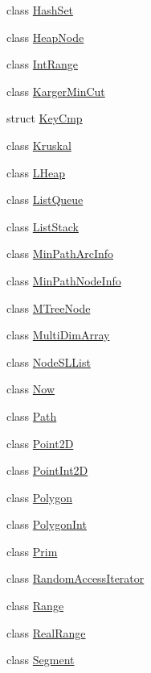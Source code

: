 \begin{DoxyCompactItemize}
class \hyperlink{class_designar_1_1_hash_set}{Hash\+Set}
\item 
class \hyperlink{class_designar_1_1_heap_node}{Heap\+Node}
\item 
class \hyperlink{class_designar_1_1_int_range}{Int\+Range}
\item 
class \hyperlink{class_designar_1_1_karger_min_cut}{Karger\+Min\+Cut}
\item 
struct \hyperlink{struct_designar_1_1_key_cmp}{Key\+Cmp}
\item 
class \hyperlink{class_designar_1_1_kruskal}{Kruskal}
\item 
class \hyperlink{class_designar_1_1_l_heap}{L\+Heap}
\item 
class \hyperlink{class_designar_1_1_list_queue}{List\+Queue}
\item 
class \hyperlink{class_designar_1_1_list_stack}{List\+Stack}
\item 
class \hyperlink{class_designar_1_1_min_path_arc_info}{Min\+Path\+Arc\+Info}
\item 
class \hyperlink{class_designar_1_1_min_path_node_info}{Min\+Path\+Node\+Info}
\item 
class \hyperlink{class_designar_1_1_m_tree_node}{M\+Tree\+Node}
\item 
class \hyperlink{class_designar_1_1_multi_dim_array}{Multi\+Dim\+Array}
\item 
class \hyperlink{class_designar_1_1_node_s_l_list}{Node\+S\+L\+List}
\item 
class \hyperlink{class_designar_1_1_now}{Now}
\item 
class \hyperlink{class_designar_1_1_path}{Path}
\item 
class \hyperlink{class_designar_1_1_point2_d}{Point2D}
\item 
class \hyperlink{class_designar_1_1_point_int2_d}{Point\+Int2D}
\item 
class \hyperlink{class_designar_1_1_polygon}{Polygon}
\item 
class \hyperlink{class_designar_1_1_polygon_int}{Polygon\+Int}
\item 
class \hyperlink{class_designar_1_1_prim}{Prim}
\item 
class \hyperlink{class_designar_1_1_random_access_iterator}{Random\+Access\+Iterator}
\item 
class \hyperlink{class_designar_1_1_range}{Range}
\item 
class \hyperlink{class_designar_1_1_real_range}{Real\+Range}
\item 
class \hyperlink{class_designar_1_1_segment}{Segment}

\end{DoxyCompactItemize}
